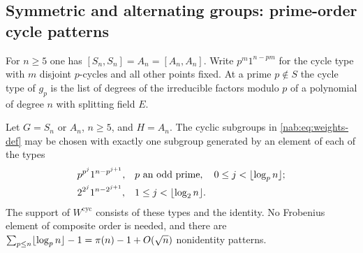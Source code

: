 \subsection{Symmetric and alternating groups: prime-order cycle patterns}\label{nab:sec:sn}
\begingroup\raggedright
{}
\endgroup

For $n\ge5$ one has $[S_n,S_n]=A_n=[A_n,A_n]$. Write $p^m1^{n-pm}$ for the cycle type with
$m$ disjoint $p$-cycles and all other points fixed. At a prime $p\notin S$ the cycle type
of $g_p$ is the list of degrees of the irreducible factors modulo $p$ of a polynomial of
degree $n$ with splitting field $E$.

\begin{theorem}\label{nab:thm:patterns}
Let $G=S_n$ or $A_n$, $n\ge5$, and $H=A_n$. The cyclic subgroups in
\eqref{nab:eq:weights-def} may be chosen with exactly one subgroup generated by an element
of each of the types
\begin{align*}
 &p^{p^j}1^{n-p^{j+1}}, && p\text{ an odd prime},\quad 0\le j<\lfloor\log_pn\rfloor;\\
 &2^{2^j}1^{n-2^{j+1}}, && 1\le j<\lfloor\log_2n\rfloor.
\end{align*}
The support of $W^{\mathrm{cyc}}$ consists of these types and the identity. No Frobenius
element of composite order is needed, and there are
$\sum_{p\le n}\lfloor\log_pn\rfloor-1=\pi(n)-1+O(\sqrt n)$ nonidentity patterns.
\end{theorem}
